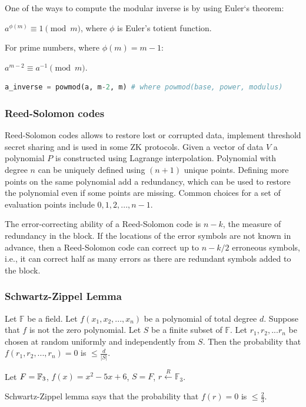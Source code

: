 \documentclass[../lecture-notes.tex]{subfiles}
\begin{document}
One of the ways to compute the modular inverse is by using Euler`s theorem:

$a^{\phi(m)} \equiv 1 \pmod{m}$, where $\phi$ is Euler's totient function. 

For prime numbers, where $\phi(m) = m-1$:

$a^{m-2} \equiv a^{-1} \pmod{m}$.

\begin{lstlisting}[language=Python]
    a_inverse = powmod(a, m-2, m) # where powmod(base, power, modulus)
\end{lstlisting}

\subsubsection{Reed-Solomon codes}

Reed-Solomon codes allows to restore lost or corrupted data, implement threshold secret sharing and is used in some ZK protocols.
Given a vector of data $V$ a polynomial $P$ is constructed using Lagrange interpolation.
Polynomial with degree $n$ can be uniquely defined using $(n+1)$ unique points. Defining more points on the same polynomial add a redundancy,
which can be used to restore the polynomial even if some points are missing.
Common choices for a set of evaluation points include ${0, 1, 2, ..., n - 1}$.

The error-correcting ability of a Reed-Solomon code is $n-k$, the measure of redundancy in the block. 
If the locations of the error symbols are not known in advance, then a Reed-Solomon code can correct up to
$n-k/2$ erroneous symbols, i.e., it can correct half as many errors as there are redundant symbols added to the block.

\subsubsection{Schwartz-Zippel Lemma}

\begin{lemma}
Let $\mathbb{F}$ be a field. Let $f(x_1, x_2, ..., x_n)$ be a polynomial of total degree $d$. Suppose that $f$ is not the zero polynomial. Let $S$ be
a finite subset of $\mathbb{F}$. Let $r_1, r_2, ... r_n$ be chosen at random uniformly and independently from $S$. Then the probability that 
$f(r_1, r_2, ..., r_n) = 0$ is $\le \frac{d}{|S|}$.
\end{lemma}

\begin{example}
Let $F = \mathbb{F}_3$, $f(x) = x^2 - 5x + 6$, $S = F$, $r \xleftarrow{R} \mathbb{F}_3$.

Schwartz-Zippel lemma says that the probability that $f(r) = 0$ is $\le \frac{2}{3}$.
\end{example}
\end{document}
